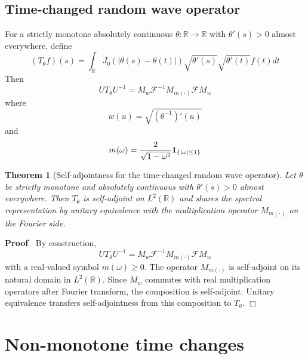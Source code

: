 \documentclass{article}
\newcommand{\cdummy}{\cdot}
\newcommand{\tmtextbf}[1]{\text{{\bfseries{#1}}}}
\newenvironment{proof}{\noindent\textbf{Proof\ }}{\hspace*{\fill}$\Box$\medskip}
{\theorembodyfont{\rmfamily}\newtheorem{example}{Example}}
\newtheorem{theorem}{Theorem}
\begin{document}
\subsection{Time-changed random wave operator}

For a strictly monotone absolutely continuous $\theta : \mathbb{R} \to
\mathbb{R}$ with $\theta' (s) > 0$ almost everywhere, define
\begin{equation}
  (T_{\theta} f) (s) = \int_{\mathbb{R}} J_0 (| \theta (s) - \theta (t) |)
  \sqrt{\theta' (s)}  \sqrt{\theta' (t)} f (t) dt
\end{equation}
Then
\begin{equation}
  UT_{\theta} U^{- 1} = M_w \mathcal{F}^{- 1} M_{m (\cdummy)} \mathcal{F}M_w
\end{equation}
where
\begin{equation}
  w (u) = \sqrt{(\theta^{- 1})' (u)}
\end{equation}
and
\begin{equation}
  m (\omega) = \frac{2}{\sqrt{1 - \omega^2}} \text{\tmtextbf{1}}_{\{| \omega |
  \le 1\}}
\end{equation}
\begin{theorem}[Self-adjointness for the time-changed random wave operator]
  Let $\theta$ be strictly monotone and absolutely continuous with $\theta'
  (s) > 0$ almost everywhere. Then $T_{\theta}$ is self-adjoint on $L^2
  (\mathbb{R})$ and shares the spectral representation by unitary equivalence
  with the multiplication operator $M_{m (\cdummy)}$ on the Fourier side.
\end{theorem}

\begin{proof}
  By construction,
  \begin{equation}
    UT_{\theta} U^{- 1} = M_w \mathcal{F}^{- 1} M_{m (\cdummy)} \mathcal{F}M_w
  \end{equation}
  with a real-valued symbol $m (\omega) \geq 0$. The operator $M_{m
  (\cdummy)}$ is self-adjoint on its natural domain in $L^2 (\mathbb{R})$.
  Since $M_w$ commutes with real multiplication operators after Fourier
  transform, the composition is self-adjoint. Unitary equivalence transfers
  self-adjointness from this composition to $T_{\theta}$.
\end{proof}

\section{Non-monotone time changes}
\end{document}
